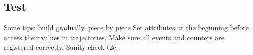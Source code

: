 \documentclass{article}
\begin{document}
\subsection{Test}
Some tips: build gradually, piece by piece
Set attributes at the beginning before access their values in trajectories.
Make sure all events and counters are registered correctly.
Sanity check t2e.
\end{document}
